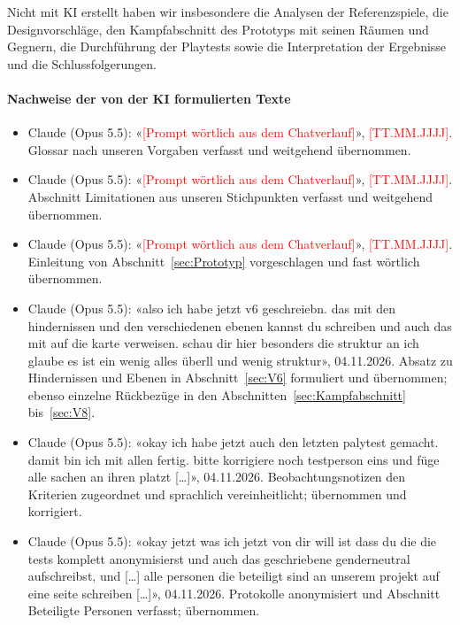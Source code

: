 \documentclass[../Main.tex]{subfiles}
\begin{document}
Nicht mit KI erstellt haben wir insbesondere die Analysen der Referenzspiele, die Designvorschläge, den Kampfabschnitt des Prototyps mit seinen Räumen und Gegnern, die Durchführung der Playtests sowie die Interpretation der Ergebnisse und die Schlussfolgerungen.

\paragraph{Nachweise der von der KI formulierten Texte}
\begin{itemize}[leftmargin=1.5cm, itemsep=0.4em]
    \item Claude (Opus 5.5): «\textcolor{red}{[Prompt wörtlich aus dem Chatverlauf]}», \textcolor{red}{[TT.MM.JJJJ]}. Glossar nach unseren Vorgaben verfasst und weitgehend übernommen.
    \item Claude (Opus 5.5): «\textcolor{red}{[Prompt wörtlich aus dem Chatverlauf]}», \textcolor{red}{[TT.MM.JJJJ]}. Abschnitt Limitationen aus unseren Stichpunkten verfasst und weitgehend übernommen.
    \item Claude (Opus 5.5): «\textcolor{red}{[Prompt wörtlich aus dem Chatverlauf]}», \textcolor{red}{[TT.MM.JJJJ]}. Einleitung von Abschnitt~\ref{sec:Prototyp} vorgeschlagen und fast wörtlich übernommen.
    \item Claude (Opus 5.5): «also ich habe jetzt v6 geschreiebn. das mit den hindernissen und den verschiedenen ebenen kannst du schreiben und auch das mit auf die karte verweisen. schau dir hier besonders die struktur an ich glaube es ist ein wenig alles überll und wenig struktur», 04.11.2026. Absatz zu Hindernissen und Ebenen in Abschnitt~\ref{sec:V6} formuliert und übernommen; ebenso einzelne Rückbezüge in den Abschnitten~\ref{sec:Kampfabschnitt} bis~\ref{sec:V8}.
    \item Claude (Opus 5.5): «okay ich habe jetzt auch den letzten palytest gemacht. damit bin ich mit allen fertig. bitte korrigiere noch testperson eins und füge alle sachen an ihren platzt [\ldots]», 04.11.2026. Beobachtungsnotizen den Kriterien zugeordnet und sprachlich vereinheitlicht; übernommen und korrigiert.
    \item Claude (Opus 5.5): «okay jetzt was ich jetzt von dir will ist dass du die die tests komplett anonymisierst und auch das geschriebene genderneutral aufschreibst, und [\ldots] alle personen die beteiligt sind an unserem projekt auf eine seite schreiben [\ldots]», 04.11.2026. Protokolle anonymisiert und Abschnitt Beteiligte Personen verfasst; übernommen.
\end{itemize}
\end{document}
